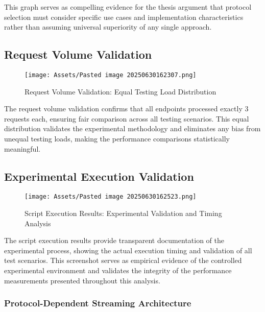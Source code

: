 This graph serves as compelling evidence for the thesis argument that protocol selection must consider specific use cases and implementation characteristics rather than assuming universal superiority of any single approach.

\subsection{Request Volume Validation}


\begin{figure}[h]
\centering
\texttt{[image: Assets/Pasted image 20250630162307.png]}
\caption{Request Volume Validation: Equal Testing Load Distribution}
\label{fig:request_volume_validation}
\end{figure}

The request volume validation confirms that all endpoints processed exactly 3 requests each, ensuring fair comparison across all testing scenarios. This equal distribution validates the experimental methodology and eliminates any bias from unequal testing loads, making the performance comparisons statistically meaningful.

\subsection{Experimental Execution Validation}

\begin{figure}[h]
\centering
\texttt{[image: Assets/Pasted image 20250630162523.png]}
\caption{Script Execution Results: Experimental Validation and Timing Analysis}
\label{fig:script_execution_results}
\end{figure}

The script execution results provide transparent documentation of the experimental process, showing the actual execution timing and validation of all test scenarios. This screenshot serves as empirical evidence of the controlled experimental environment and validates the integrity of the performance measurements presented throughout this analysis.

\subsubsection{Protocol-Dependent Streaming Architecture}

